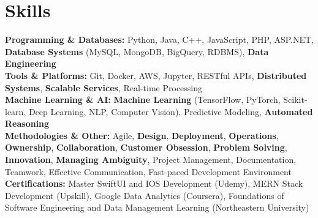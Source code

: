 \documentclass[a4paper,10pt]{article}
\begin{document}
\section*{Skills}
\textbf{Programming \& Databases: } Python, Java, C++, JavaScript, PHP, ASP.NET, \textbf{Database Systems} (MySQL, MongoDB, BigQuery, RDBMS), \textbf{Data Engineering} \\
\textbf{Tools \& Platforms:} Git, Docker, AWS, Jupyter, RESTful APIs, \textbf{Distributed Systems}, \textbf{Scalable Services}, Real-time Processing\\
\textbf{Machine Learning \& AI: } \textbf{Machine Learning} (TensorFlow, PyTorch, Scikit-learn, Deep Learning, NLP, Computer Vision), Predictive Modeling, \textbf{Automated Reasoning} \\
\textbf{Methodologies \& Other:} Agile, \textbf{Design}, \textbf{Deployment}, \textbf{Operations}, \textbf{Ownership}, \textbf{Collaboration}, \textbf{Customer Obsession}, \textbf{Problem Solving}, \textbf{Innovation}, \textbf{Managing Ambiguity}, Project Management, Documentation, Teamwork, Effective Communication, Fast-paced Development Environment \\
\textbf{Certifications:} Master SwiftUI and IOS Development (Udemy), MERN Stack Development (Upskill), Google Data Analytics (Coursera), Foundations of Software Engineering and Data Management Learning (Northeastern University) \\

\vspace{-4mm}
\end{document}
